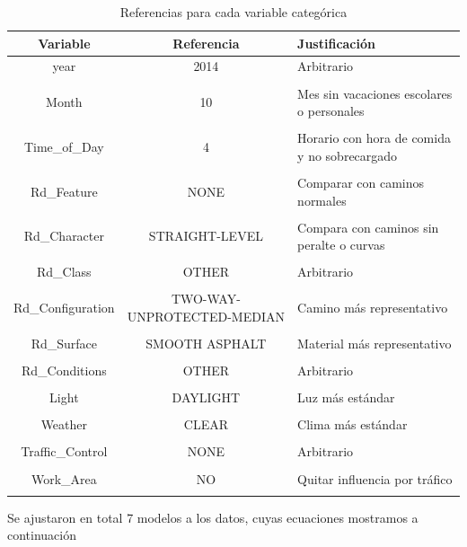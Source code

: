 \documentclass[11pt]{article}
\begin{document}
\begin{table}[H]
    \centering
    \begin{tabular}{ccp{3cm}}    
             
     \hline
     Variable & Referencia & Justificación \\
     \hline
     year  & 2014  & Arbitrario \\
     & & \\
     Month  & 10  & Mes sin vacaciones escolares o personales  \\
     & & \\
     Time\_of\_Day  & 4  & Horario con hora de comida y no sobrecargado \\
     & & \\
     Rd\_Feature  & NONE  & Comparar con caminos normales \\
     & & \\
     Rd\_Character  & STRAIGHT-LEVEL  & Compara con caminos sin peralte o curvas \\
     & & \\
     Rd\_Class  & OTHER  & Arbitrario \\
     & & \\
     Rd\_Configuration  & TWO-WAY-UNPROTECTED-MEDIAN  & Camino más representativo \\
     & & \\
     Rd\_Surface  & SMOOTH ASPHALT  & Material más representativo \\
     & & \\
     Rd\_Conditions  & OTHER  & Arbitrario \\
     & & \\
     Light  & DAYLIGHT  & Luz más estándar \\
     & & \\
     Weather  & CLEAR  & Clima más estándar \\
     & & \\
     Traffic\_Control  & NONE  & Arbitrario \\
     & & \\
     Work\_Area & NO & Quitar influencia por tráfico \\
     & & \\
     \hline
    \end{tabular}
    \caption{Referencias para cada variable categórica}
    \label{tab:3-data}
\end{table}
Se ajustaron en total 7 modelos a los datos, cuyas ecuaciones mostramos a continuación
\end{document}
